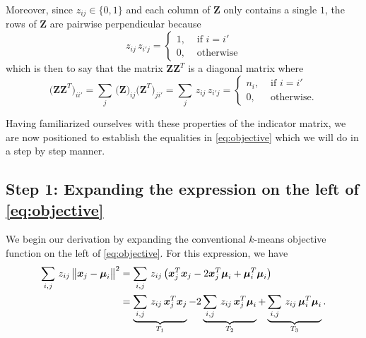 \documentclass[fleqn]{llncs}
\newcommand{\mat}[1]{\boldsymbol{{#1}}}
\renewcommand{\vec}[1]{\boldsymbol{{#1}}}
\newcommand{\dsq}[2]{\bigl \lVert #1 - #2 \bigr \rVert^2}
\begin{document}
Moreover, since $z_{ij} \in \{0,1\}$ and each column of $\mat{Z}$ only contains a single $1$, the rows of $\mat{Z}$ are pairwise perpendicular because
\begin{equation}
z_{ij} \, z_{i'j} =
\begin{cases}
1, & \text{ if } i = i' \\
0, & \text{ otherwise}
\end{cases}
\end{equation}
which is then to say that the matrix $\mat{Z} \mat{Z}^T$ is a diagonal matrix where
\begin{equation}
\bigl( \mat{Z} \mat{Z}^T \bigr)_{ii'}
= \sum_j \, \bigl( \mat{Z} \bigr)_{ij} \bigl( \mat{Z}^T \bigr)_{j i'}
= \sum_j \, z_{ij} \, z_{i'j}
=
\begin{cases}
n_i, & \text{ if } i = i' \\
0, & \text{ otherwise.}
\end{cases}
\end{equation}

Having familiarized ourselves with these properties of the indicator matrix, we are now positioned to establish the equalities in \eqref{eq:objective} which we will do in a step by step manner.



\subsection{Step 1: Expanding the expression on the left of \eqref{eq:objective}}

We begin our derivation by expanding the conventional $k$-means objective function on the left of \eqref{eq:objective}. For this expression, we have
\begin{align}
\label{eq:expandl}
\sum_{i, j} \, z_{ij} \, \dsq{\vec{x}_j}{\vec{\mu}_i}
& = \sum_{i, j} \, z_{ij} \, \bigl( \vec{x}_j^T \vec{x}_j - 2 \vec{x}_j^T \vec{\mu}_i + \vec{\mu}_i^T \vec{\mu}_i\bigr) \notag \\
& = \underbrace{\sum_{i, j} \, z_{ij} \, \vec{x}_j^T \vec{x}_j}_{T_1}
- 2 \underbrace{\sum_{i, j} \, z_{ij} \, \vec{x}_j^T \vec{\mu}_i}_{T_2}
+   \underbrace{\sum_{i, j} \, z_{ij} \, \vec{\mu}_i^T \vec{\mu}_i}_{T_3} .
\end{align}
\end{document}

